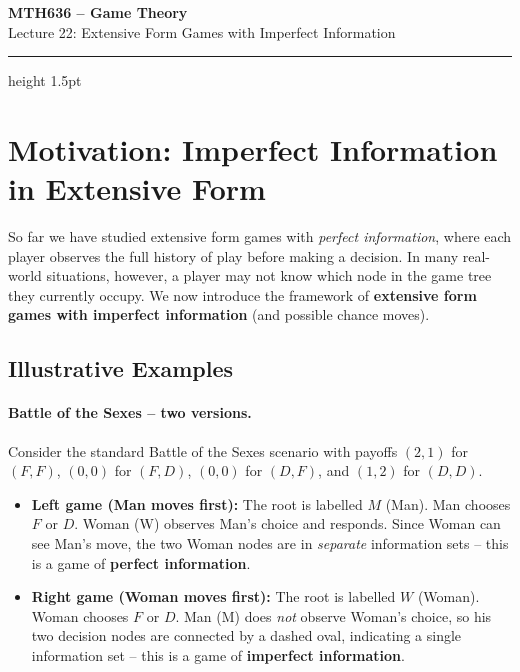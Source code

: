\documentclass[12pt, a4paper]{article}
\begin{document}
\begin{center}
  {\LARGE\bfseries\sffamily\color{defblue} MTH636 -- Game Theory}\\[6pt]
  {\Large\sffamily Lecture 22: Extensive Form Games with Imperfect Information}\\[4pt]
\end{center}
\vspace{0.5cm}
\hrule height 1.5pt
\vspace{0.3cm}

\section{Motivation: Imperfect Information in Extensive Form}

So far we have studied extensive form games with \emph{perfect information}, where each player observes the full history of play before making a decision. In many real-world situations, however, a player may not know which node in the game tree they currently occupy. We now introduce the framework of \textbf{extensive form games with imperfect information} (and possible chance moves).

\subsection{Illustrative Examples}

\paragraph{Battle of the Sexes -- two versions.}
Consider the standard Battle of the Sexes scenario with payoffs $(2,1)$ for $(F,F)$, $(0,0)$ for $(F,D)$, $(0,0)$ for $(D,F)$, and $(1,2)$ for $(D,D)$.

\begin{itemize}
  \item \textbf{Left game (Man moves first):} The root is labelled $M$ (Man). Man chooses $F$ or $D$. Woman (W) observes Man's choice and responds. Since Woman can see Man's move, the two Woman nodes are in \emph{separate} information sets -- this is a game of \textbf{perfect information}.
  \item \textbf{Right game (Woman moves first):} The root is labelled $W$ (Woman). Woman chooses $F$ or $D$. Man (M) does \emph{not} observe Woman's choice, so his two decision nodes are connected by a dashed oval, indicating a single information set -- this is a game of \textbf{imperfect information}.
\end{itemize}
\end{document}
